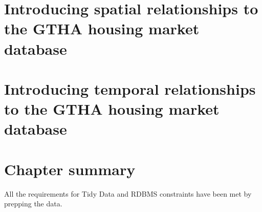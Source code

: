 \section{Introducing spatial relationships to the GTHA housing market database} \label{sec:introducing_spatial_relationships}

\section{Introducing temporal relationships to the GTHA housing market database} \label{sec:introducing_temporal_relationships}

\section{Chapter summary} \label{sec:data_preparation_summary}
All the requirements for Tidy Data and RDBMS constraints have been met by prepping the data.
